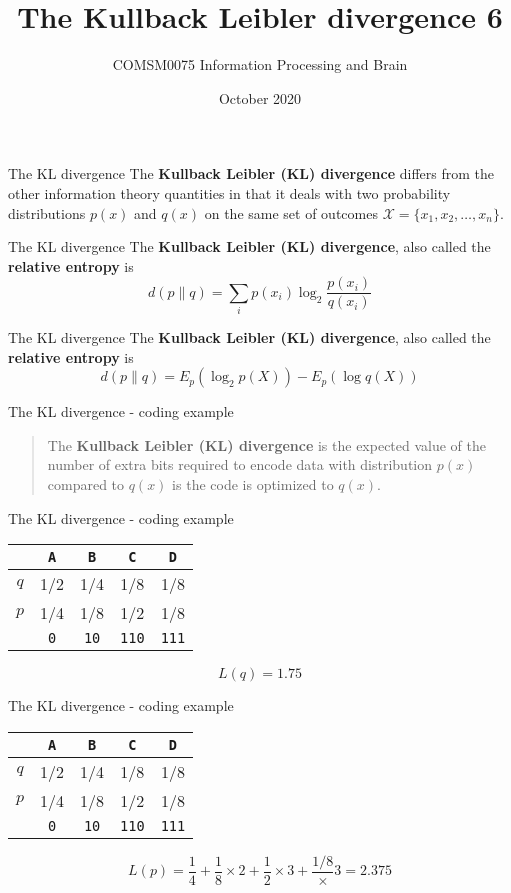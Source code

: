 \documentclass{beamer}
\title[Information Theory task 2]{The Kullback Leibler divergence 6}
\author{COMSM0075 Information Processing and Brain}
\institute{\texttt{comsm0075.github.io}}
\date{October 2020}
\newcommand{\crish}{\color{reddish}}
\newcommand{\cbla}{\color{black}}
\newcommand{\letter}[1]{\color{blue}\texttt{#1}\color{black}}
\newcommand{\binary}[1]{\color{red}\texttt{#1}\color{black}}
\begin{document}
\maketitle

\begin{frame}{The KL divergence}
  The \textbf{Kullback Leibler (KL) divergence} differs from the other
  information theory quantities in that it deals with two probability
  distributions $p(x)$ and $q(x)$ on the same set of outcomes
  \crish$\mathcal{X}=\{x_1,x_2,\ldots,x_n\}$\cbla.
\end{frame}

\begin{frame}{The KL divergence}
  The \textbf{Kullback Leibler (KL) divergence}, also called the \textbf{relative entropy} is
  \crish
  $$
  d(p\|q)=\sum_i p(x_i)\log_2{\frac{p(x_i)}{q(x_i)}}
    $$
    \cbla
\end{frame}

\begin{frame}{The KL divergence}
  The \textbf{Kullback Leibler (KL) divergence}, also called the \textbf{relative entropy} is
  \crish
  $$
  d(p\|q)=E_p(\log_2{p(X)})-E_p(\log{q(X)})
    $$
    \cbla
\end{frame}


\begin{frame}{The KL divergence - coding example}
\begin{quote}
  The \textbf{Kullback Leibler (KL) divergence} is the expected value
  of the number of extra bits required to encode data with
  distribution $p(x)$ compared to $q(x)$ is the code is optimized to
  $q(x)$.
  \end{quote}
\end{frame}

\begin{frame}{The KL divergence - coding example}

\begin{center}
\begin{tabular}{c|cccc}
&\letter{A}&\letter{B}&\letter{C}&\letter{D}\\
\hline
$q$&1/2&1/4&1/8&1/8\\
$p$&1/4&1/8&1/2&1/8\\
\hline
&\binary{0}&\binary{10}&\binary{110}&\binary{111}
\end{tabular}
\end{center}
\crish
$$
L(q)=1.75
$$
\cbla
\end{frame}


\begin{frame}{The KL divergence - coding example}
\begin{center}
\begin{tabular}{c|cccc}
&\letter{A}&\letter{B}&\letter{C}&\letter{D}\\
\hline
$q$&1/2&1/4&1/8&1/8\\
$p$&1/4&1/8&1/2&1/8\\
\hline
&\binary{0}&\binary{10}&\binary{110}&\binary{111}
\end{tabular}
\end{center}
\crish
$$
L(p)=\frac{1}{4}+\frac{1}{8}\times 2 +\frac{1}{2}\times 3+\frac{1/8}\times 3=2.375
$$
\cbla
\end{frame}
\end{document}
